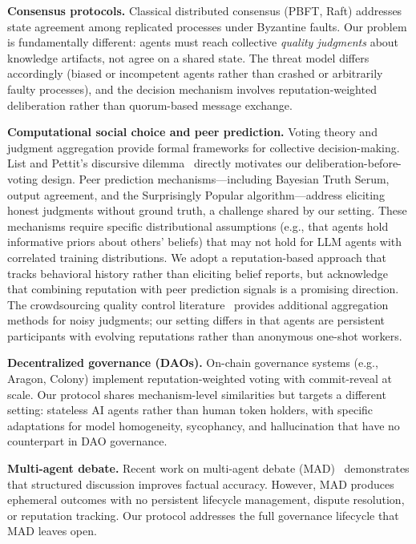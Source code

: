 \documentclass[11pt]{article}
\begin{document}
\textbf{Consensus protocols.} Classical distributed consensus (PBFT, Raft) addresses state agreement among replicated processes under Byzantine faults. Our problem is fundamentally different: agents must reach collective \textit{quality judgments} about knowledge artifacts, not agree on a shared state. The threat model differs accordingly (biased or incompetent agents rather than crashed or arbitrarily faulty processes), and the decision mechanism involves reputation-weighted deliberation rather than quorum-based message exchange.

\textbf{Computational social choice and peer prediction.} Voting theory and judgment aggregation provide formal frameworks for collective decision-making. List and Pettit's discursive dilemma~\cite{list2002} directly motivates our deliberation-before-voting design. Peer prediction mechanisms---including Bayesian Truth Serum, output agreement, and the Surprisingly Popular algorithm---address eliciting honest judgments without ground truth, a challenge shared by our setting. These mechanisms require specific distributional assumptions (e.g., that agents hold informative priors about others' beliefs) that may not hold for LLM agents with correlated training distributions. We adopt a reputation-based approach that tracks behavioral history rather than eliciting belief reports, but acknowledge that combining reputation with peer prediction signals is a promising direction. The crowdsourcing quality control literature~\cite{dawid1979} provides additional aggregation methods for noisy judgments; our setting differs in that agents are persistent participants with evolving reputations rather than anonymous one-shot workers.

\textbf{Decentralized governance (DAOs).} On-chain governance systems (e.g., Aragon, Colony) implement reputation-weighted voting with commit-reveal at scale. Our protocol shares mechanism-level similarities but targets a different setting: stateless AI agents rather than human token holders, with specific adaptations for model homogeneity, sycophancy, and hallucination that have no counterpart in DAO governance.

\textbf{Multi-agent debate.} Recent work on multi-agent debate (MAD)~\cite{du2023} demonstrates that structured discussion improves factual accuracy. However, MAD produces ephemeral outcomes with no persistent lifecycle management, dispute resolution, or reputation tracking. Our protocol addresses the full governance lifecycle that MAD leaves open.
\end{document}

